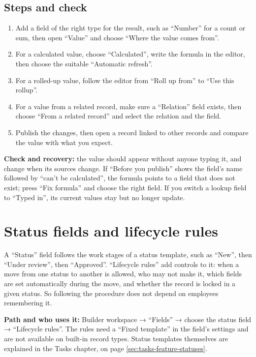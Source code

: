 \subsection{Steps and check}
\begin{enumerate}
\item Add a field of the right type for the result, such as “Number” for a count or sum, then open “Value” and choose “Where the value comes from”.
\item For a calculated value, choose “Calculated”, write the formula in the editor, then choose the suitable “Automatic refresh”.
\item For a rolled-up value, follow the editor from “Roll up from” to “Use this rollup”.
\item For a value from a related record, make sure a “Relation” field exists, then choose “From a related record” and select the relation and the field.
\item Publish the changes, then open a record linked to other records and compare the value with what you expect.
\end{enumerate}

\textbf{Check and recovery:} the value should appear without anyone typing it, and change when its sources change. If “Before you publish” shows the field's name followed by “can’t be calculated”, the formula points to a field that does not exist; press “Fix formula” and choose the right field. If you switch a lookup field to “Typed in”, its current values stay but no longer update.

\clearpage
\section{Status fields and lifecycle rules}
\label{sec:builder-feature-lifecycle}

A “Status” field follows the work stages of a status template, such as “New”, then “Under review”, then “Approved”. “Lifecycle rules” add controls to it: when a move from one status to another is allowed, who may not make it, which fields are set automatically during the move, and whether the record is locked in a given status. So following the procedure does not depend on employees remembering it.

\textbf{Path and who uses it:} Builder workspace → “Fields” → choose the status field → “Lifecycle rules”. The rules need a “Fixed template” in the field's settings and are not available on built-in record types. Status templates themselves are explained in the Tasks chapter, on page \ref{sec:tasks-feature-statuses}.

